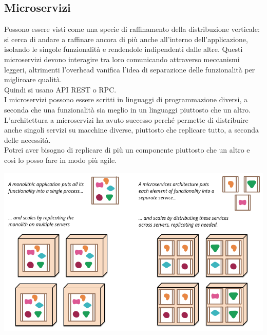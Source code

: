 \subsection{Microservizi}
Possono essere visti come una specie di raffinamento della distribuzione verticale: si cerca di andare a raffinare ancora di più anche all'interno dell'applicazione, isolando le singole funzionalità e rendendole indipendenti dalle altre. Questi microservizi devono interagire tra loro comunicando attraverso meccanismi leggeri, altrimenti l'overhead vanifica l'idea di separazione delle funzionalità per migliroare qualità. \\
Quindi si usano API REST o RPC. \\
I microservizi possono essere scritti in linguaggi di programmazione diversi, a seconda che una funzionalità sia meglio in un linguaggi piuttosto che un altro.\\ 
L'architettura a microservizi ha avuto successo perché permette di distribuire anche singoli servizi su macchine diverse, piuttosto che replicare tutto, a seconda delle necessità. \\
Potrei aver bisogno di replicare di più un componente piuttosto che un altro e così lo posso fare in modo più agile.
\begin{center}
    \includegraphics[width = .6\textwidth]{images/lezione2/sketch.png}
\end{center}

